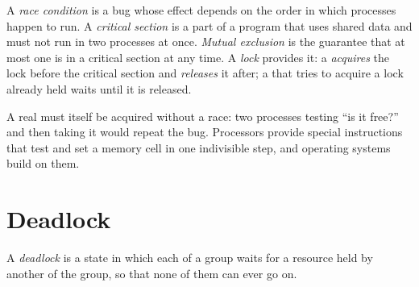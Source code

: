 \begin{definition}\label{def:g12:processes-and-scheduling:race}
A \emph{race condition} is a bug whose effect depends on the order in which processes happen to
run. A \emph{critical section} is a part of a program that uses shared data and must not run
in two processes at once. \emph{Mutual exclusion} is the guarantee that at most one  is
in a critical section at any time. A \emph{lock} provides it: a  \emph{acquires} the lock before the
critical section and \emph{releases} it after; a  that tries to acquire a lock already held waits until it is
released.
\end{definition}

\label{lst:g12:processes-and-scheduling:lock}

\label{out:g12:processes-and-scheduling:lock}

A real  must itself be acquired without a race: two processes testing ``is it free?'' and then taking it would
repeat the bug. Processors provide special instructions that test and set a memory cell in one indivisible step, and
operating systems build  on them.

\section{Deadlock}\label{sec:g12:processes-and-scheduling:deadlock}

\begin{definition}[Deadlock]\label{def:g12:processes-and-scheduling:deadlock}
A \emph{deadlock} is a state in which each  of a group waits for a resource held by another
 of the group, so that none of them can ever go on.
\end{definition}

